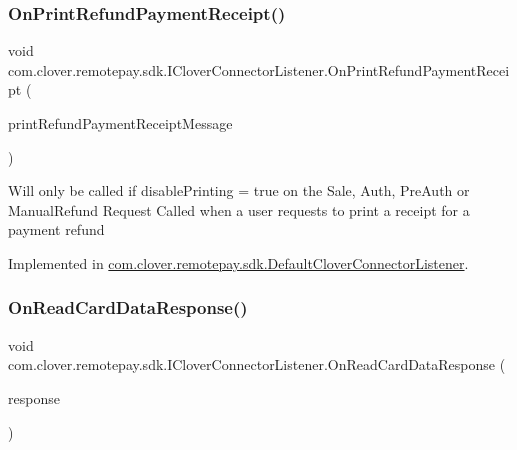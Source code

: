 \subsubsection{\texorpdfstring{On\+Print\+Refund\+Payment\+Receipt()}{OnPrintRefundPaymentReceipt()}}
{\footnotesize\ttfamily void com.\+clover.\+remotepay.\+sdk.\+I\+Clover\+Connector\+Listener.\+On\+Print\+Refund\+Payment\+Receipt (\begin{DoxyParamCaption}\item[{\hyperlink{classcom_1_1clover_1_1remotepay_1_1sdk_1_1_print_refund_payment_receipt_message}{Print\+Refund\+Payment\+Receipt\+Message}}]{print\+Refund\+Payment\+Receipt\+Message }\end{DoxyParamCaption})}



Will only be called if disable\+Printing = true on the Sale, Auth, Pre\+Auth or Manual\+Refund Request Called when a user requests to print a receipt for a payment refund 



Implemented in \hyperlink{classcom_1_1clover_1_1remotepay_1_1sdk_1_1_default_clover_connector_listener_a13de716522e58beb9af010207e7362f2}{com.\+clover.\+remotepay.\+sdk.\+Default\+Clover\+Connector\+Listener}.

\mbox{\label{interfacecom_1_1clover_1_1remotepay_1_1sdk_1_1_i_clover_connector_listener_af4bbb0ceeab318ef482f0e90506d36b0}} 
\subsubsection{\texorpdfstring{On\+Read\+Card\+Data\+Response()}{OnReadCardDataResponse()}}
{\footnotesize\ttfamily void com.\+clover.\+remotepay.\+sdk.\+I\+Clover\+Connector\+Listener.\+On\+Read\+Card\+Data\+Response (\begin{DoxyParamCaption}\item[{\hyperlink{classcom_1_1clover_1_1remotepay_1_1sdk_1_1_read_card_data_response}{Read\+Card\+Data\+Response}}]{response }\end{DoxyParamCaption})}



